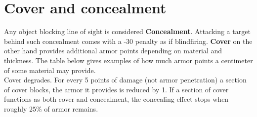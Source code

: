 \section{Cover and concealment}
Any object blocking line of sight is considered \textbf{Concealment}. Attacking a target behind such concealment comes with a -30 penalty as if blindfiring.
\textbf{Cover} on the other hand provides additional armor points depending on material and thickness. The table below gives examples of how much armor points a centimeter of some material may provide.\\
Cover degrades. For every 5 points of damage (not armor penetration) a section of cover blocks, the armor it provides is reduced by 1. If a section of cover functions as both cover and concealment, the concealing effect stops when roughly 25\% of armor remains.
